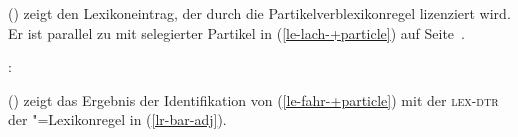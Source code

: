 () zeigt den Lexikoneintrag, der durch die Partikelverblexikonregel lizenziert
wird. Er ist parallel zu  mit selegierter Partikel in (\ref{le-lach-+particle}) auf Seite~\pageref{le-lach-+particle}.
\newsavebox{\boxxcompfuenfa}
\ea
\label{le-fahr-+particle}
\begin{minipage}[t]{\linewidth}
\mbox{:}\\
\end{minipage}
\z
() zeigt das Ergebnis der Identifikation von (\ref{le-fahr-+particle}) 
mit der \textsc{lex-dtr} der \bard"=Lexikonregel in (\ref{lr-bar-adj}).

